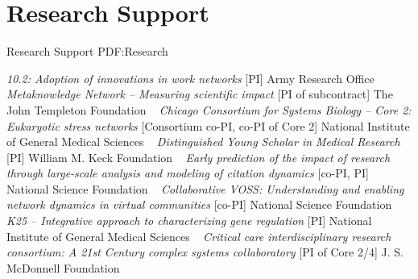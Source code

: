 \section
{Research Support}
{Research Support}
{PDF:Research}

\textit{10.2: Adoption of innovations in work networks}
    [PI]
\newline
Army Research Office
\newline
~
\Gap{}
\textit{Metaknowledge Network -- Measuring scientific impact}
    [PI of subcontract]
\newline
The John Templeton Foundation
\newline
~
\Gap{}
\textit{Chicago Consortium for Systems Biology -- Core 2: Eukaryotic stress networks}
    [Consortium co-PI, co-PI of Core 2]
\newline
National Institute of General Medical Sciences
\newline
~
\Gap{}
\textit{Distinguished Young Scholar in Medical Research}
    [PI]
\newline
William M. Keck Foundation
\newline
~
\Gap{}
\textit{Early prediction of the impact of research through large-scale analysis and modeling of citation dynamics}
    [co-PI, PI]
\newline
National Science Foundation 
\newline
~
\Gap{}
\textit{Collaborative VOSS: Understanding and enabling network dynamics in virtual communities}
    [co-PI]
\newline
National Science Foundation 
\newline
~
\Gap{}
\textit{K25 -- Integrative approach to characterizing gene regulation}
    [PI]
\newline
National Institute of General Medical Sciences
\newline
~
\Gap{}
\textit{Critical care interdisciplinary research consortium: A 21st Century complex systems collaboratory}
    [PI of Core 2/4]
\newline
J. S. McDonnell Foundation 
\newline
~
\Gap\vspace*{0.2cm}